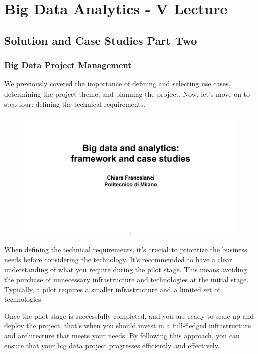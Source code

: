 \section{Big Data Analytics - V Lecture}

\subsection{Solution and Case Studies Part Two}

\subsubsection{Big Data Project Management}

We previously covered the
importance of defining and selecting use cases, determining the project
theme, and planning the project. Now, let's move on to step four:
defining the technical requirements.

\begin{figure}[!h]
    \centering
    \includegraphics[page=88, trim = 0cm 3cm 1.5cm 4.5cm, clip, width=\textwidth]{images/06 - BIG_DATA.pdf}
\end{figure}

When defining the technical requirements, it's crucial to prioritize the
business needs before considering the technology. It's recommended to
have a clear understanding of what you require during the pilot stage.
This means avoiding the purchase of unnecessary infrastructure and
technologies at the initial stage. Typically, a pilot requires a smaller
infrastructure and a limited set of technologies.

Once the pilot stage is successfully completed, and you are ready to
scale up and deploy the project, that's when you should invest in a
full-fledged infrastructure and architecture that meets your needs. By
following this approach, you can ensure that your big data project
progresses efficiently and effectively.

